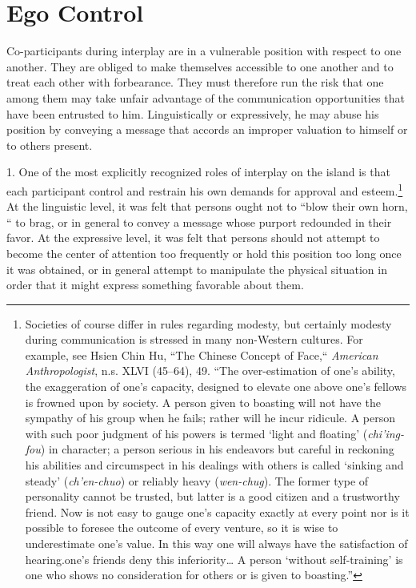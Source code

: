 \documentclass[twoside,symmetric,nobib,justified]{tufte-book}
\begin{document}
\hypertarget{ego-control}{%
\section{Ego Control}\label{ego-control}}

Co-participants during interplay are in a vulnerable position with
respect to one another. They are obliged to make themselves accessible
to one another and to treat each other with forbearance. They must
therefore run the risk that one among them may take unfair advantage of
the communication opportunities that have been entrusted to him.
Linguistically or expressively, he may abuse his position by conveying a
message that accords an improper valuation to himself or to others
present.

1. One of the most explicitly recognized roles of interplay on the
island is that each participant control and restrain his own demands for
approval and esteem.\footnote{Societies of course differ in rules
  regarding modesty, but certainly modesty during communication is
  stressed in many non-Western cultures. For example, see Hsien Chin Hu,
  ``The Chinese Concept of Face,`` \emph{American Anthropologist}, n.s.
  XLVI (45--64), 49. ``The over-estimation of one's ability, the
  exaggeration of one's capacity, designed to elevate one above one's
  fellows is frowned upon by society. A person given to boasting will
  not have the sympathy of his group when he fails; rather will he incur
  ridicule. A person with such poor judgment of his powers is termed
  `light and floating' (\emph{chi'ing-fou}) in character; a person
  serious in his endeavors but careful in reckoning his abilities and
  circumspect in his dealings with others is called `sinking and steady'
  (\emph{ch'en-chuo}) or reliably heavy (\emph{wen-chug}). The former
  type of personality cannot be trusted, but latter is a good citizen
  and a trustworthy friend. Now is not easy to gauge one's capacity
  exactly at every point nor is it possible to foresee the outcome of
  every venture, so it is wise to underestimate one's value. In this way
  one will always have the satisfaction of hearing.one's friends deny
  this inferiority\ldots{} A person `without self-training' is one who
  shows no consideration for others or is given to boasting.''} At the
linguistic level, it was felt that persons ought not to ``blow their own
horn, `` to brag, or in general to convey a message whose purport
redounded in their favor. At the expressive level, it was felt that
persons should not attempt to become the center of attention too
frequently or hold this position too long once it was obtained, or in
general attempt to manipulate the physical situation in order that it
might express something favorable about them.
\end{document}
